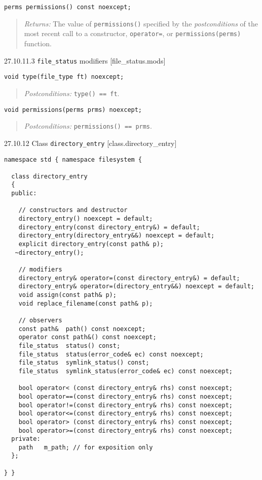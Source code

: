 \begin{verbatim}
perms permissions() const noexcept;
\end{verbatim}

\begin{quote}
\emph{Returns:} The value of \texttt{permissions()} specified by the
\emph{postconditions} of the most recent call to a constructor,
\texttt{operator=}, or \texttt{permissions(perms)} function.
\end{quote}

27.10.11.3 \texttt{file\_status} modifiers {[}file\_status.mods{]}

\begin{verbatim}
void type(file_type ft) noexcept;
\end{verbatim}

\begin{quote}
\emph{Postconditions:} \texttt{type()\ ==\ ft}.
\end{quote}

\begin{verbatim}
void permissions(perms prms) noexcept;
\end{verbatim}

\begin{quote}
\emph{Postconditions:} \texttt{permissions()\ ==\ prms}.
\end{quote}

27.10.12 Class \texttt{directory\_entry} {[}class.directory\_entry{]}

\begin{verbatim}
namespace std { namespace filesystem {

  class directory_entry
  {
  public:

    // constructors and destructor
    directory_entry() noexcept = default;
    directory_entry(const directory_entry&) = default;
    directory_entry(directory_entry&&) noexcept = default;
    explicit directory_entry(const path& p);
   ~directory_entry();

    // modifiers
    directory_entry& operator=(const directory_entry&) = default;
    directory_entry& operator=(directory_entry&&) noexcept = default;
    void assign(const path& p);
    void replace_filename(const path& p);

    // observers
    const path&  path() const noexcept;
    operator const path&() const noexcept;
    file_status  status() const;
    file_status  status(error_code& ec) const noexcept;
    file_status  symlink_status() const;
    file_status  symlink_status(error_code& ec) const noexcept;

    bool operator< (const directory_entry& rhs) const noexcept;
    bool operator==(const directory_entry& rhs) const noexcept;
    bool operator!=(const directory_entry& rhs) const noexcept;
    bool operator<=(const directory_entry& rhs) const noexcept;
    bool operator> (const directory_entry& rhs) const noexcept;
    bool operator>=(const directory_entry& rhs) const noexcept;
  private:
    path   m_path; // for exposition only
  };

} }  
\end{verbatim}

